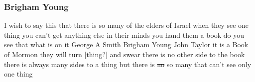 	\subsubsection{Brigham Young} %
		\label{UNFOLD-BY}
	
		\begin{compactdesc}
			\item[{\hyperref[EMS-1865-BY-8-OCT-1865]{8 October 1865}}] I wish to say this that there is so many of the elders of Israel when they see one thing you can't get anything else in their minds you hand them a book do you see that what is on it George A Smith Brigham Young John Taylor it is a Book of Mormon they will turn [thing?] and swear there is no other side to the book there is always many sides to a thing but there is \sout{no} so many that can't see only one thing
		\end{compactdesc}
	

	
		
